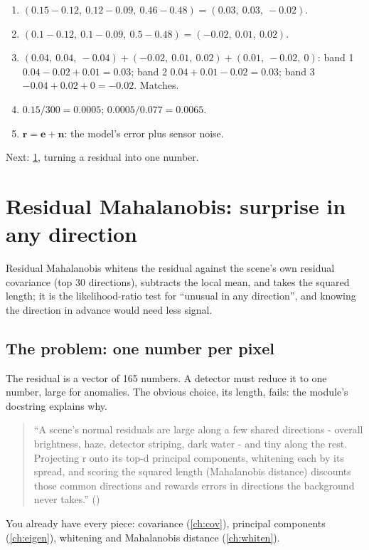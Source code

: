\documentclass[11pt,a4paper,oneside,openany]{book}
\newcommand{\B}[1]{{\symbf{#1}}}
\newcommand{\B}[1]{{\bm{#1}}}
\newcommand{\vr}{\B{r}}
\newcommand{\ve}{\B{e}}
\newcommand{\vn}{\B{n}}
\newcommand{\nextchapter}[1]{\par\medskip\noindent\hfill\textsf{\small Next: #1}\par}
\begin{document}
\begin{answers}
\begin{enumerate}
\item $(0.15-0.12,\ 0.12-0.09,\ 0.46-0.48)=(0.03,\ 0.03,\ -0.02)$.
\item $(0.1-0.12,\ 0.1-0.09,\ 0.5-0.48)=(-0.02,\ 0.01,\ 0.02)$.
\item $(0.04,\ 0.04,\ -0.04)+(-0.02,\ 0.01,\ 0.02)+(0.01,\ -0.02,\ 0)$: band 1 $0.04-0.02+0.01=0.03$; band 2 $0.04+0.01-0.02=0.03$;
  band 3 $-0.04+0.02+0=-0.02$. Matches.
\item $0.15/300=0.0005$; $0.0005/0.077=0.0065$.
\item $\vr=\ve+\vn$: the model's error plus sensor noise.
\end{enumerate}
\end{answers}

\nextchapter{\cref{ch:rm}, turning a residual into one number.}

\chapter{Residual Mahalanobis: surprise in any direction}
\label{ch:rm}

\begin{onething}
Residual Mahalanobis whitens the residual against the scene's own residual covariance (top 30 directions), subtracts the local
mean, and takes the squared length; it is the likelihood-ratio test for ``unusual in any direction'', and knowing the direction in
advance would need less signal.
\end{onething}

\section{The problem: one number per pixel}

The residual is a vector of 165 numbers. A detector must reduce it to one number, large for anomalies. The obvious choice, its length,
fails: the module's docstring explains why.
\begin{quote}\small
``A scene's normal residuals are large along a few shared directions - overall brightness, haze, detector striping, dark water - and
tiny along the rest. Projecting r onto its top-d principal components, whitening each by its spread, and scoring the squared length
(Mahalanobis distance) discounts those common directions and rewards errors in directions the background never takes.''
\hfill()
\end{quote}
You already have every piece: covariance (\cref{ch:cov}), principal components (\cref{ch:eigen}), whitening and Mahalanobis distance
(\cref{ch:whiten}).
\end{document}
